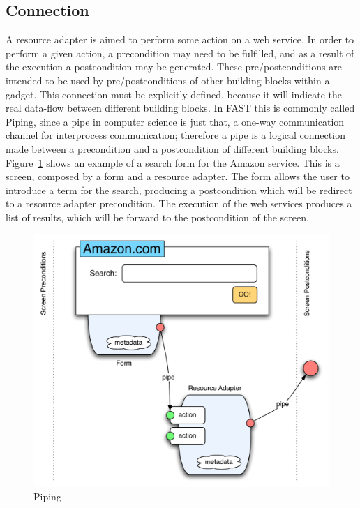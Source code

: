 \documentclass{fast_latex}
\begin{document}

\subsection{Connection} %
\label{sub:connection}

A resource adapter is aimed to perform some action on a web service. In order to perform a given action, a precondition may need to be fulfilled, and as a result of the execution a postcondition may be generated. These pre/postconditions are intended to be used by pre/postconditions of other building blocks within a gadget. This connection must be explicitly defined, because it will indicate the real data-flow between different building blocks. In FAST this is commonly called Piping, since a pipe in computer science is just that, a one-way communication channel for interprocess communication; therefore a pipe is a logical connection made between a precondition and a postcondition of different building blocks. Figure~\ref{fig:Piping} shows an example of a search form for the Amazon service. This is a screen, composed by a form and a resource adapter. The form allows the user to introduce a term for the search, producing a postcondition which will be redirect to a resource adapter precondition. The execution of the web services produces a list of results, which will be forward to the postcondition of the screen.

\begin{figure}[!htb]
  \begin{center}
    \includegraphics[width=12cm]{images/piping.pdf}
    \caption{Piping}
    \label{fig:Piping}
  \end{center}
\end{figure}
\end{document}
